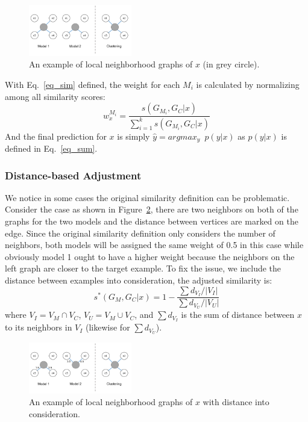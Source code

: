 \begin{figure}[h]
\centering
    \includegraphics[width=0.4\textwidth]{./fig/lwe_graph}
\caption{An example of local neighborhood graphs of $x$ (in grey circle).}
\label{fig:graph}
\end{figure}

With Eq.~\ref{eq_sim} defined, the weight for each $M_i$ is calculated by normalizing among all similarity scores:
\begin{equation}\label{eq_norm}
w_{x}^{M_i} = \frac {s(G_{M_i}, G_C|x)} {\sum_{i=1}^k s(G_{M_i}, G_C|x)}
\end{equation}
And the final prediction for $x$ is simply $\hat y = argmax_y \enspace p(y|x)$ as $p(y|x)$ is defined in Eq.~\ref{eq_sum}.

\subsubsection{Distance-based Adjustment}
We notice in some cases the original similarity definition can be problematic. Consider the case as shown in Figure~\ref{graph_dist}, there are two neighbors on both of the graphs for the two models and the distance between vertices are marked on the edge. Since the original similarity definition only considers the number of neighbors, both models will be assigned the same weight of 0.5 in this case while obviously model 1 ought to have a higher weight because the neighbors on
the left graph are closer to the target example.
To fix the issue, we include the distance between examples into consideration, the adjusted similarity is:
\begin{equation}\label{d_sim}
s^\ast(G_M, G_C|x) = 1 - \frac {\sum d_{V_I}/|V_I|} {\sum d_{V_U}/|V_U|}
\end{equation}
where $V_I = V_M \cap V_C$, $V_U = V_M \cup V_C$, and $\sum d_{V_I}$ is the sum of distance between $x$ to its neighbors in $V_I$ (likewise for $\sum d_{V_U}$).

\begin{figure}[h]
\centering
    \includegraphics[width=0.4\textwidth]{./fig/lwe_d_graph}
\caption{An example of local neighborhood graphs of $x$ with distance into consideration.}
\label{graph_dist}
\end{figure}

